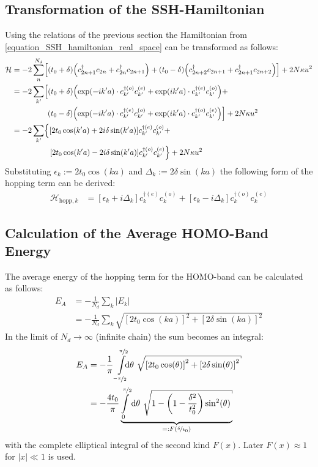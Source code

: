 \subsection*{Transformation of the SSH-Hamiltonian}
Using the relations of the previous section the Hamiltonian from \cref{equation_SSH_hamiltonian_real_space} can be transformed as follows:
\begin{align}
\mathcal{H} &= -2\sum_n^{N_d} \left[\left(t_0+\delta\right)\left(c_{2n+1}^\dagger c_{2n} + c_{2n}^\dagger c_{2n+1} \right) + 
\left(t_0-\delta\right)\left(c_{2n+2}^\dagger c_{2n+1} + c_{2n+1}^\dagger c_{2n+2}\right)\right]+2N\kappa u^2\\
&= -2\sum_{k'} \left[\left(t_0+\delta\right)\left(\exp\left(-ik'a\right) \cdot c_{k'}^{\dagger(o)}c_{k'}^{(e)} + \exp\left(ik'a\right)\cdot c_{k'}^{\dagger(e)}c_{k'}^{(o)}\right)+ \right.\nonumber\\
&\hspace*{1.6cm}\left.\left(t_0-\delta\right)\left(\exp\left(-ik'a\right)\cdot  c_{k'}^{\dagger(e)}c_{k'}^{(o)}+\exp\left(ik'a\right)\cdot  c_{k'}^{\dagger(o)}c_{k'}^{(e)}\right)\right]+2N\kappa u^2\\
&= -2\sum_{k'} \left\{\left[2t_0\cos(k'a) + 2i\delta\sin(k'a)\right]c_{k'}^{\dagger(e)}c_{k'}^{(o)} + \right.\nonumber\\
&\hspace*{1.7cm}\left. \left[2t_0\cos(k'a)-2i\delta\sin(k'a)\right] c_{k'}^{\dagger(o)}c_{k'}^{(e)}\right\}+2N\kappa u^2
\end{align}
Substituting $\epsilon_k := 2t_0\cos(ka)$ and $\Delta_k := 2\delta\sin(ka)$ the following form of the hopping term can be derived:
\begin{align}
\mathcal{H}_{\text{hopp},k} &=
\left[\epsilon_k + i\Delta_k\right]c_{k}^{\dagger(e)}c_{k}^{(o)} + \left[\epsilon_k-i\Delta_k \right]	c_{k}^{\dagger(o)}c_{k}^{(e)}
\end{align}
\subsection*{Calculation of the Average HOMO-Band Energy}
The average energy of the hopping term for the HOMO-band can be calculated as follows:
\begin{align}
E_A &=-\frac{1}{N_d}\sum_k |E_k|\\
&= -\frac{1}{N_d}\sum_k \sqrt{\left[2t_0\cos(ka)\right]^2+\left[2\delta\sin(ka)\right]^2}
\end{align}
In the limit of $N_d \rightarrow \infty$ (infinite chain) the sum becomes an integral:
\begin{align}
E_A &= -\frac{1}{\pi}\int\limits_{\nicefrac{-\pi}{2}}^{\nicefrac{\pi}{2}}\hspace*{-0.2cm}\text{d}\theta\ \sqrt{\left[2t_0\cos(\theta)\right]^2+\left[2\delta\sin(\theta)\right]^2}\\
&=-\frac{4t_0}{\pi}\underbrace{\int\limits_{0}^{\nicefrac{\pi}{2}}\text{d}\theta\ \sqrt{1-\left(1-\frac{\delta^2}{t_0^2}\right)\sin^2(\theta)}}_{=:F(\nicefrac{\delta}{t_0})}
\end{align}
with the complete elliptical integral of the second kind $F(x)$. Later $F(x) \approx 1$ for $|x|\ll 1$ is used.

